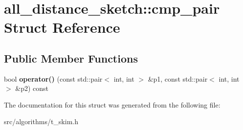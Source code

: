 \hypertarget{structall__distance__sketch_1_1cmp__pair}{}\section{all\+\_\+distance\+\_\+sketch\+:\+:cmp\+\_\+pair Struct Reference}
\label{structall__distance__sketch_1_1cmp__pair}
\subsection*{Public Member Functions}
\begin{DoxyCompactItemize}
\item 
\hypertarget{structall__distance__sketch_1_1cmp__pair_a122255ecf31d9f9371acf735649b9adf}{}bool {\bfseries operator()} (const std\+::pair$<$ int, int $>$ \&p1, const std\+::pair$<$ int, int $>$ \&p2) const \label{structall__distance__sketch_1_1cmp__pair_a122255ecf31d9f9371acf735649b9adf}

\end{DoxyCompactItemize}


The documentation for this struct was generated from the following file\+:\begin{DoxyCompactItemize}
\item 
src/algorithms/t\+\_\+skim.\+h\end{DoxyCompactItemize}
